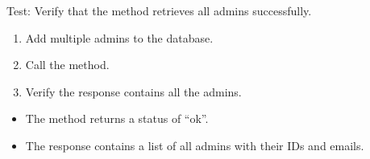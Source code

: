 \documentclass[letterpaper,10pt,english]{sphinxmanual}
\begin{document}
\begin{fulllineitems}
\label{\detokenize{test:test.test_admin.test_list_admins_success}}
\pysigstartsignatures
\pysiglinewithargsret
{}
{}
{}
\pysigstopsignatures
\sphinxAtStartPar
Test: Verify that the method retrieves all admins successfully.
\begin{description}
\begin{enumerate}
%
\item {} 
\sphinxAtStartPar
Add multiple admins to the database.

\item {} 
\sphinxAtStartPar
Call the  method.

\item {} 
\sphinxAtStartPar
Verify the response contains all the admins.

\end{enumerate}

\begin{itemize}
\item {} 
\sphinxAtStartPar
The method returns a status of “ok”.

\item {} 
\sphinxAtStartPar
The response contains a list of all admins with their IDs and emails.

\end{itemize}

\end{description}

\end{fulllineitems}

\end{document}
